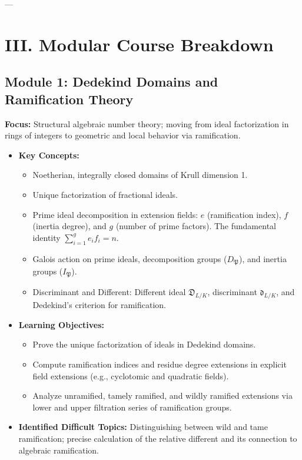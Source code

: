 \documentclass[11pt]{article}
\begin{document}
---

\section*{III. Modular Course Breakdown}

\subsection*{Module 1: Dedekind Domains and Ramification Theory}
\textbf{Focus:} Structural algebraic number theory; moving from ideal factorization in rings of integers to geometric and local behavior via ramification.

\begin{itemize}[leftmargin=*]
    \item \textbf{Key Concepts:}
        \begin{itemize}
            \item Noetherian, integrally closed domains of Krull dimension 1.
            \item Unique factorization of fractional ideals.
            \item Prime ideal decomposition in extension fields: $e$ (ramification index), $f$ (inertia degree), and $g$ (number of prime factors). The fundamental identity $\sum_{i=1}^g e_i f_i = n$.
            \item Galois action on prime ideals, decomposition groups ($D_\mathfrak{P}$), and inertia groups ($I_\mathfrak{P}$).
            \item Discriminant and Different: Different ideal $\mathfrak{D}_{L/K}$, discriminant $\mathfrak{d}_{L/K}$, and Dedekind's criterion for ramification.
        \end{itemize}
    \item \textbf{Learning Objectives:}
        \begin{itemize}
            \item Prove the unique factorization of ideals in Dedekind domains.
            \item Compute ramification indices and residue degree extensions in explicit field extensions (e.g., cyclotomic and quadratic fields).
            \item Analyze unramified, tamely ramified, and wildly ramified extensions via lower and upper filtration series of ramification groups.
        \end{itemize}
    \item \textbf{Identified Difficult Topics:} Distinguishing between wild and tame ramification; precise calculation of the relative different and its connection to algebraic ramification.
\end{itemize}
\end{document}
